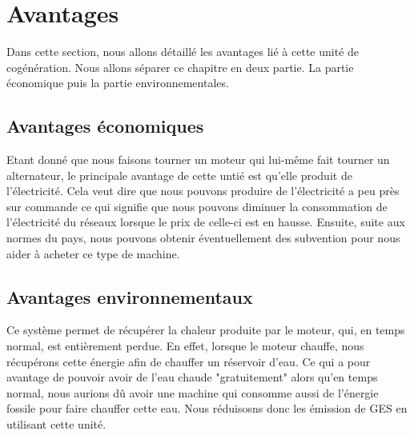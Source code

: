 \section{Avantages}
\label{sec:avantages}
Dans cette section, nous allons détaillé les avantages lié à cette unité de cogénération. Nous allons séparer ce chapitre en deux partie. La partie économique puis la partie environnementales.
\subsection{Avantages économiques}
\label{subsec:avantages-eco}
Etant donné que nous faisons tourner un moteur qui lui-même fait tourner un alternateur, le principale avantage de cette untié est qu'elle produit de l'électricité.
Cela veut dire que nous pouvons produire de l'électricité a peu près sur commande ce qui signifie que nous pouvons diminuer la consommation de l'électricité du réseaux lorsque le prix de celle-ci est en hausse.
Ensuite, suite aux normes du pays, nous pouvons obtenir éventuellement des subvention pour nous aider à acheter ce type de machine.

\subsection{Avantages environnementaux}
\label{subsec:avantages-env}
Ce système permet de récupérer la chaleur produite par le moteur, qui, en temps normal, est entièrement perdue. En effet, lorsque le moteur chauffe, 
nous récupérons cette énergie afin de chauffer un réservoir d'eau. Ce qui a pour avantage de pouvoir avoir de l'eau chaude "gratuitement" alors qu'en temps normal,
nous aurions dû avoir une machine qui consomme aussi de l'énergie fossile pour faire chauffer cette eau.
Nous réduisosns donc les émission de GES en utilisant cette unité.
